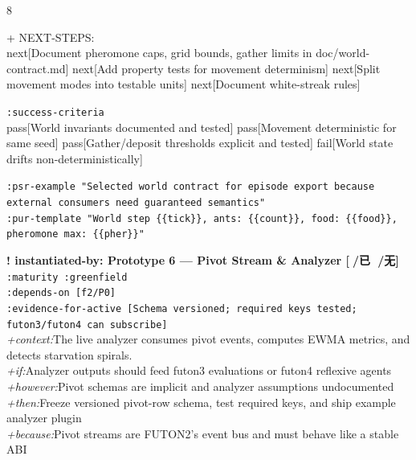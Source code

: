 \documentclass[landscape]{article}
\newcommand{\flexitag}[1]{\textcolor[gray]{0.35}{\textit{#1}}}
\newenvironment{devmapgreenfield}{%
  \def\FrameCommand{\colorbox{devmapgreenfieldbg}}%
  \setlength{\fboxsep}{2pt}%
  \MakeFramed{\advance\hsize-\width \FrameRestore}%
}{\endMakeFramed}
\begin{document}
\begin{paracol}{8}
\begin{devmapgreenfield}
\par
  + NEXT-STEPS:\\
    next[Document pheromone caps, grid bounds, gather limits in doc/world-contract.md] next[Add property tests for movement determinism] next[Split movement modes into testable units] next[Document white-streak rules]\\
\par
  \texttt{:\allowbreak{}success-\allowbreak{}criteria}\\
    pass[World invariants documented and tested] pass[Movement deterministic for same seed] pass[Gather/deposit thresholds explicit and tested] fail[World state drifts non-deterministically]\\
\par
  \texttt{:\allowbreak{}psr-\allowbreak{}example "Selected world contract for episode export because external consumers need guaranteed semantics"}\\
  \texttt{:\allowbreak{}pur-\allowbreak{}template "World step \{\{tick\}\},\allowbreak{} ants:\allowbreak{} \{\{count\}\},\allowbreak{} food:\allowbreak{} \{\{food\}\},\allowbreak{} pheromone max:\allowbreak{} \{\{pher\}\}"}\\
\par
\par
\end{devmapgreenfield}
\begin{devmapgreenfield}
\textbf{! instantiated-by: Prototype 6 — Pivot Stream \& Analyzer [🚢/已 🐲/无]}\\
  \texttt{:\allowbreak{}maturity :\allowbreak{}greenfield}\\
  \texttt{:\allowbreak{}depends-\allowbreak{}on [f2/\allowbreak{}P0]}\\
  \texttt{:\allowbreak{}evidence-\allowbreak{}for-\allowbreak{}active [Schema versioned;\allowbreak{} required keys tested;\allowbreak{} futon3/\allowbreak{}futon4 can subscribe]}\\
  \flexitag{+context:}The live analyzer consumes pivot events, computes EWMA metrics, and detects starvation spirals.\\
  \flexitag{+if:}Analyzer outputs should feed futon3 evaluations or futon4 reflexive agents\\
  \flexitag{+however:}Pivot schemas are implicit and analyzer assumptions undocumented\\
  \flexitag{+then:}Freeze versioned pivot-row schema, test required keys, and ship example analyzer plugin\\
  \flexitag{+because:}Pivot streams are FUTON2’s event bus and must behave like a stable ABI\\

\end{devmapgreenfield}
\end{paracol}
\end{document}
